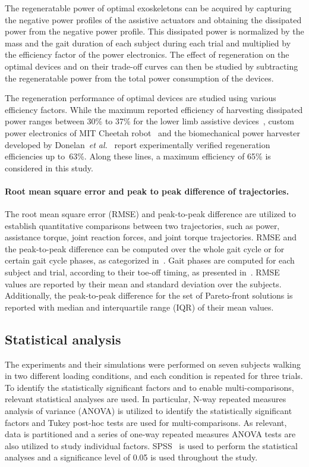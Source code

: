 \documentclass[10pt,letterpaper]{article}
\newcommand{\etal}{\textit{et al.}}
\begin{document}
The regeneratable power of optimal exoskeletons can be acquired by capturing the negative power profiles of the assistive actuators and obtaining the dissipated power from the negative power profile. This dissipated power is normalized by the mass and the gait duration of each subject during each trial and multiplied by the efficiency factor of the power electronics. The  effect of regeneration on the optimal devices and on their trade-off curves can then be studied by subtracting the regeneratable power from the total power consumption of the devices.

The regeneration performance of optimal devices are studied using various efficiency factors. While the maximum reported efficiency of harvesting dissipated power ranges between 30\% to 37\% for the lower limb assistive devices~\cite{Laschowski2019}, custom power electronics of MIT Cheetah robot~\cite{Seok2015} and the biomechanical power harvester developed by Donelan~\etal~\cite{Donelan2008} report experimentally verified regeneration efficiencies up to~63\%. Along these lines, a maximum efficiency of 65\% is considered in this study.


\paragraph*{Root mean square error and peak to peak difference of trajectories.} The root mean square error (RMSE) and peak-to-peak difference are utilized to establish quantitative comparisons between two trajectories, such as power, assistance torque, joint reaction forces, and joint torque trajectories. RMSE and the peak-to-peak difference can be computed over the whole gait cycle or for certain gait cycle phases, as categorized in~\cite{Perry1992}. Gait phases are computed for each subject and trial, according to their toe-off timing, as presented in~. RMSE values are reported by their mean and standard deviation over the subjects. Additionally, the peak-to-peak difference for the set of Pareto-front solutions is reported with median and interquartile range (IQR) of their mean values.


\subsection*{Statistical analysis}

The experiments and their simulations were performed on seven subjects walking in two different loading conditions, and each condition is repeated for three trials. To identify the statistically significant factors and to enable multi-comparisons, relevant statistical analyses are used. In particular, N-way repeated measures analysis of variance (ANOVA) is utilized to identify the statistically significant factors and Tukey post-hoc tests are used for multi-comparisons. As relevant, data is partitioned and a series of one-way repeated measures ANOVA tests are also utilized to study individual factors.  SPSS~\cite{spss} is used to perform the statistical analyses and a significance level of 0.05 is used throughout the study.
\end{document}
